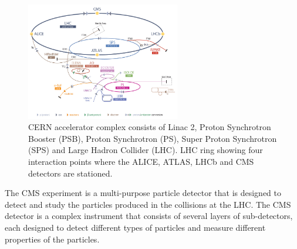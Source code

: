 \begin{figure}[!htp]
\centering
\includegraphics[width=0.6\textwidth]{ashish_thesis/lhc_schematic.png}
\caption{%
    CERN accelerator complex consists of Linac 2, Proton Synchrotron Booster (PSB), Proton Synchrotron (PS), Super Proton Synchrotron (SPS) and Large Hadron Collider (LHC). LHC ring showing four interaction points where the ALICE, ATLAS, LHCb and CMS detectors are stationed.
}
\label{fig:lhc}
\end{figure}

The CMS experiment is a multi-purpose particle detector that is designed to detect and study the particles produced in the collisions at the LHC. The CMS detector is a complex instrument that consists of several layers of sub-detectors, each designed to detect different types of particles and measure different properties of the particles.

